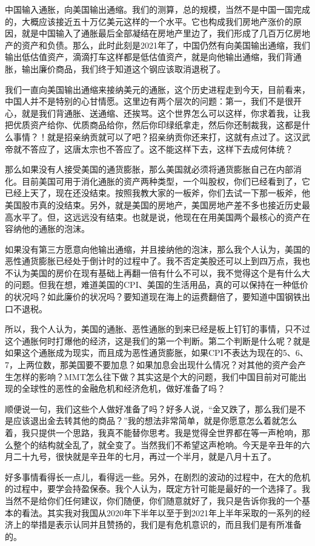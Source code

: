 \documentclass[UTF8, 12pt, a4paper]{ctexrep}
\begin{document}
中国输入通胀，向美国输出通缩。我们的测算，总的规模，当然不是中国一国完成的，大概应该接近五十万亿美元这样的一个水平。它也构成我们房地产涨价的原因，就是中国输入了通胀最后全部凝结在房地产里边了，我们形成了几百万亿房地产的资产和负债。那么，此时此刻是2021年了，中国仍然有向美国输出通缩，我们输出低估值资产，滴滴打车这样都是低估值资产，就是向他输出通缩，我们背通胀，输出廉价商品，我们终于知道这个钢应该取消退税了。

我们一直向美国输出通缩来接纳美元的通胀，这个历史进程走到今天，目前看来，中国人并不是特别的心甘情愿。这里边有两个层次的问题：第一，我们不是很开心，就是我们背通胀、送通缩、还挨骂。这个世界怎么可以这样，你求着我，让我把优质资产给你、优质商品给你，然后你印绿纸拿走，然后你还制裁我，这都是什么事情？！就是招亲纳贡就可以了吧？招亲纳贡你还来打，这就有点过了。这汉武帝就不答应了，这唐太宗也不答应了。这不能这样下去，这样下去成何体统？

那么如果没有人接受美国的通货膨胀，那么美国就必须将通货膨胀自己在内部消化。目前美国可用于消化通胀的资产两种类型，一个叫股权，你们已经看到了，它已经上天了，现在还没结束。按照我教大家的一板斧，你们去试一下那一板斧，他美国股市真的没结束。另外，就是美国的房地产，美国房地产差不多也接近历史最高水平了。但，这远远没有结束。也就是说，他现在在用美国两个最核心的资产在容纳他的通胀的泡沫。

如果没有第三方愿意向他输出通缩，并且接纳他的泡沫，那么我个人认为，美国的恶性通货膨胀已经处于倒计时的过程中了。我不否定美股还可以上到四万点，我也不认为美国的房价在现有基础上再翻一倍有什么不可以，我不觉得这个是有什么大的问题。但我在想，难道美国的CPI、美国的生活用品，真的可以保持在一种低价的状况吗？如此廉价的状况吗？要知道现在海上的运费翻倍了，要知道中国钢铁出口不退税。

所以，我个人认为，美国的通胀、恶性通胀的到来已经是板上钉钉的事情，只不过这个通胀何时打爆他的经济，这是我们的第一个判断。第二个判断是什么呢？就是如果这个通胀成为现实，而且成为恶性通货膨胀，如果CPI不表达为现在的5、6、7，上两位数，那美国要不要加息？如果加息会出现什么情况？对其他的资产会产生怎样的影响？MMT怎么往下做？其实这是个大的问题，我们中国目前对可能出现的全球性的恶性的金融危机和经济危机，做好准备了吗？

顺便说一句，我们这些个人做好准备了吗？好多人说，“金又跌了，那么我们是不是应该退出金去转其他的商品？”我的想法非常简单，就是你愿意怎么着就怎么着，我只提供一个思路，我真不能替你思考。我是觉得全世界都在等一声枪响，那么整个的结构就全乱了，就全变了。当然我们不希望这声枪响。今天是辛丑年的六月二十九号，很快就是辛丑年的七月，再过一个半月，就是八月十五了。

好多事情看得长一点儿，看得远一些。另外，在剧烈的波动的过程中，在大的危机的过程中，要学会持盈保泰。我个人认为，既定方针可能是最好的一个选择了。我当然不是给你们任何建议，你们随便，你们随意就好了，我只是告诉你我的一个基本的看法。其实我对我国从2020年下半年以至于到2021年上半年采取的一系列的经济上的举措是表示认同并且赞扬的，我们是有危机意识的，而且我们是有所准备的。
\end{document}
